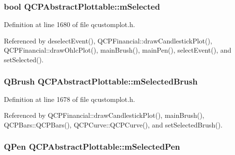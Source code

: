 \hypertarget{class_q_c_p_abstract_plottable_a43f68a0603e9bcd016bdfa6d9d5c41c9}{}
\subsubsection[{m\+Selected}]{\setlength{\rightskip}{0pt plus 5cm}bool Q\+C\+P\+Abstract\+Plottable\+::m\+Selected\hspace{0.3cm}{\ttfamily [protected]}}\label{class_q_c_p_abstract_plottable_a43f68a0603e9bcd016bdfa6d9d5c41c9}


Definition at line 1680 of file qcustomplot.\+h.



Referenced by deselect\+Event(), Q\+C\+P\+Financial\+::draw\+Candlestick\+Plot(), Q\+C\+P\+Financial\+::draw\+Ohlc\+Plot(), main\+Brush(), main\+Pen(), select\+Event(), and set\+Selected().

\hypertarget{class_q_c_p_abstract_plottable_aea3c0da30c7a8be23ad5f2d9bca36762}{}
\subsubsection[{m\+Selected\+Brush}]{\setlength{\rightskip}{0pt plus 5cm}Q\+Brush Q\+C\+P\+Abstract\+Plottable\+::m\+Selected\+Brush\hspace{0.3cm}{\ttfamily [protected]}}\label{class_q_c_p_abstract_plottable_aea3c0da30c7a8be23ad5f2d9bca36762}


Definition at line 1678 of file qcustomplot.\+h.



Referenced by Q\+C\+P\+Financial\+::draw\+Candlestick\+Plot(), main\+Brush(), Q\+C\+P\+Bars\+::\+Q\+C\+P\+Bars(), Q\+C\+P\+Curve\+::\+Q\+C\+P\+Curve(), and set\+Selected\+Brush().

\hypertarget{class_q_c_p_abstract_plottable_a10619472f5d5e10e9519a599f1cf5576}{}
\subsubsection[{m\+Selected\+Pen}]{\setlength{\rightskip}{0pt plus 5cm}Q\+Pen Q\+C\+P\+Abstract\+Plottable\+::m\+Selected\+Pen\hspace{0.3cm}{\ttfamily [protected]}}\label{class_q_c_p_abstract_plottable_a10619472f5d5e10e9519a599f1cf5576}


